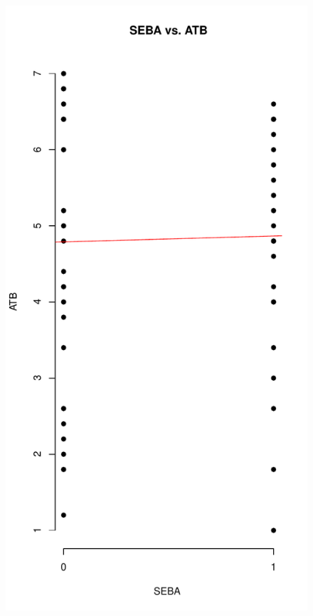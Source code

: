 \begin{figure}[H]
\begin{minipage}{.5\textwidth}
  \includegraphics[width=.5\linewidth]{images/SEBAvsATB.pdf}
  \label{fig:test2}
\end{minipage}
\end{figure}

